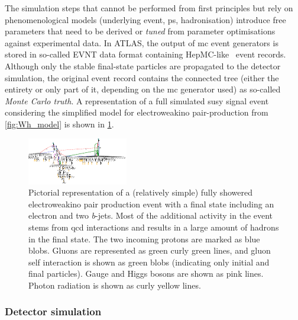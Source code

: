  The simulation steps that cannot be performed from first principles but rely on phenomenological models (underlying event, \gls{ps}, hadronisation) introduce free parameters that need to be derived or \textit{tuned} from parameter optimisations against experimental data. In ATLAS, the output of \gls{mc} event generators is stored in so-called EVNT data format containing HepMC-like~\cite{Dobbs:2001ck} event records. Although only the stable final-state particles are propagated to the detector simulation, the original event record contains the connected tree (either the entirety or only part of it, depending on the \gls{mc} generator used) as so-called \textit{Monte Carlo truth}. A representation of a full simulated \gls{susy} signal event considering the simplified model for electroweakino pair-production from \cref{fig:Wh_model} is shown in \cref{fig:mcviz_signal}. 
		
\begin{figure}
	\centering    
	\includegraphics[width=\textwidth]{test26}
	\caption{Pictorial representation of a (relatively simple) fully showered electroweakino pair production event with a final state including an electron and two \textit{b}-jets. Most of the additional activity in the event stems from \gls{qcd} interactions and results in a large amount of hadrons in the final state. The two incoming protons are marked as blue blobs. Gluons are represented as green curly green lines, and gluon self interaction is shown as green blobs (indicating only initial and final particles). Gauge and Higgs bosons are shown as pink lines. Photon radiation is shown as curly yellow lines.}
	\label{fig:mcviz_signal}
\end{figure}		
		
\subsubsection{Detector simulation}\label{sec:detector_simulation}

